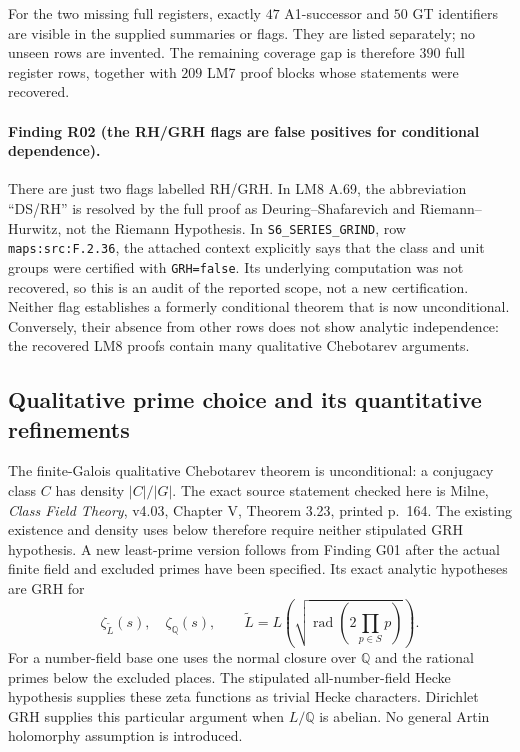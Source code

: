For the two missing full registers, exactly $47$ A1-successor and $50$
GT identifiers are visible in the supplied summaries or flags. They
are listed separately; no unseen rows are invented. The remaining
coverage gap is therefore $390$ full register rows, together with $209$
LM7 proof blocks whose statements were recovered.

\paragraph{Finding R02 (the RH/GRH flags are false positives for conditional dependence).}
There are just two flags labelled RH/GRH. In LM8 A.69, the abbreviation
``DS/RH'' is resolved by the full proof as Deuring--Shafarevich and
Riemann--Hurwitz, not the Riemann Hypothesis. In
\texttt{S6\_SERIES\_GRIND}, row \texttt{maps:src:F.2.36}, the attached
context explicitly says that the class and unit groups were certified
with \texttt{GRH=false}. Its underlying computation was not recovered,
so this is an audit of the reported scope, not a new certification.
Neither flag establishes a formerly conditional theorem that is now
unconditional. Conversely, their absence from other rows does not show
analytic independence: the recovered LM8 proofs contain many
qualitative Chebotarev arguments.

\subsection{Qualitative prime choice and its quantitative refinements}

The finite-Galois qualitative Chebotarev theorem is unconditional:
a conjugacy class $C$ has density $|C|/|G|$. The exact source statement
checked here is Milne, \emph{Class Field Theory}, v4.03,
Chapter V, Theorem 3.23, printed p.~164.
The existing existence and density uses below therefore require neither
stipulated GRH hypothesis. A new least-prime version follows from
Finding G01 after the actual finite field and excluded primes have
been specified. Its exact analytic hypotheses are GRH for
\[
 \zeta_{\widetilde L}(s),\quad\zeta_{\mathbb Q}(s),\qquad
 \widetilde L=L\!\left(\sqrt{\operatorname{rad}
                     (2\prod_{p\in S}p)}\right).
\]
For a number-field base one uses the normal closure over $\mathbb Q$
and the rational primes below the excluded places. The stipulated
all-number-field Hecke hypothesis supplies these zeta functions as
trivial Hecke characters. Dirichlet GRH supplies this particular
argument when $L/\mathbb Q$ is abelian. No general Artin holomorphy
assumption is introduced.

